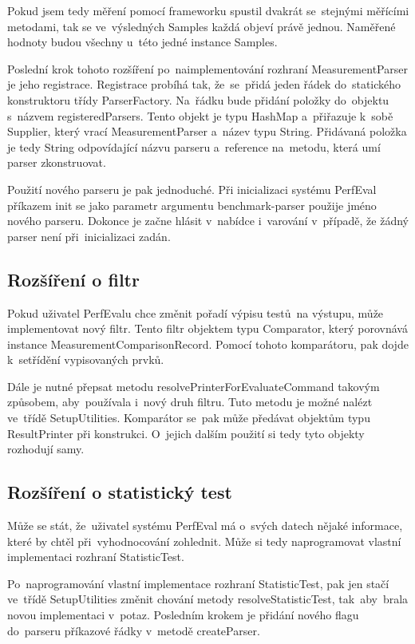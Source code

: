 Pokud jsem tedy měření pomocí frameworku spustil dvakrát se~stejnými měřícími metodami, tak se ve~výsledných Samples
každá objeví právě jednou. Naměřené hodnoty budou všechny u~této jedné instance Samples.

Poslední krok tohoto rozšíření po~naimplementování rozhraní MeasurementParser je jeho registrace. Registrace probíhá tak,
že~se~přidá jeden řádek do~statického konstruktoru třídy ParserFactory. Na~řádku bude přidání položky do~objektu
s~názvem registeredParsers. Tento objekt je typu HashMap a~přiřazuje k~sobě Supplier, který vrací MeasurementParser
a~název typu String. Přidávaná položka je tedy String odpovídající názvu parseru a~reference na~metodu,
která umí parser zkonstruovat.

Použití nového parseru je pak jednoduché. Při inicializaci systému PerfEval příkazem init se jako parametr argumentu
benchmark-parser použije jméno nového parseru. Dokonce je začne hlásit v~nabídce i~varování v~případě, že žádný parser
není při~inicializaci zadán.

\subsection{Rozšíření o filtr}

Pokud uživatel PerfEvalu chce změnit pořadí výpisu testů~na výstupu, může implementovat nový filtr.
Tento filtr objektem typu Comparator, který porovnává instance MeasurementComparisonRecord. Pomocí tohoto
komparátoru, pak dojde k~setřídění vypisovaných prvků.

Dále je nutné přepsat metodu resolvePrinterForEvaluateCommand takovým způsobem, aby~používala i~nový druh filtru.
Tuto metodu je možné nalézt ve~třídě SetupUtilities. Komparátor se~pak může předávat objektům typu ResultPrinter
při konstrukci. O~jejich dalším použití si tedy tyto objekty rozhodují samy.

\subsection{Rozšíření o statistický test}

Může se stát, že~uživatel systému PerfEval má o~svých datech nějaké informace, které
by chtěl při~vyhodnocování zohlednit. Může si tedy naprogramovat vlastní implementaci
rozhraní StatisticTest.

Po~naprogramování vlastní implementace rozhraní StatisticTest, pak jen stačí ve~třídě SetupUtilities
změnit chování metody resolveStatisticTest, tak~aby~brala novou implementaci v~potaz. Posledním krokem je
přidání nového flagu do~parseru příkazové řádky v~metodě createParser.

